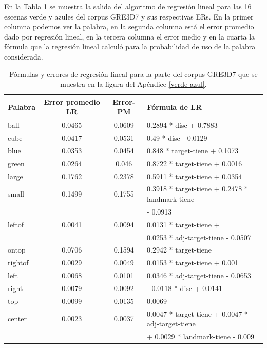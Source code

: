 En la Tabla \ref{tabla-linear-regresion-all} se muestra la salida del algoritmo de regresi\'on lineal para las 16 escenas verde y azules del corpus GRE3D7 y sus respectivas ERs. En la primer columna podemos ver la palabra, 
en la segunda columna est\'a el error promedio dado por regresi\'on lineal, en la tercera columna el error medio 
y en la cuarta la f\'ormula que la regresi\'on lineal calcul\'o para la probabilidad de uso de la palabra considerada.
\medskip
\begin{table}[h]
\begin{center}
\begin{tabular}{|l|c|c|l|}
\hline
Palabra &Error promedio	LR	& Error-PM	& F\'ormula de LR\\
\hline
ball		 &0.0465   &0.0609	  & 0.2894 * disc + 0.7883\\
\hline
cube		 &0.0417	 &0.0531	  &0.49   * disc - 0.0129\\
\hline
\hline
blue		 &0.0353	 &0.0454	  &0.848  * target-tiene + 0.1073\\
\hline
green		 &0.0264	 &0.046	    &0.8722 * target-tiene + 0.0016\\
\hline
\hline
large		 &0.1762	 &0.2378	  &0.5911 * target-tiene + 0.0354\\
\hline
small		 &0.1499	 &0.1755	  &0.3918 * target-tiene + 0.2478 * landmark-tiene\\
				 &				 &					&- 0.0913\\
\hline
\hline
leftof  &0.0041	 &0.0094	  &0.0131 * target-tiene +\\
				 &				 &					&0.0253 * adj-target-tiene - 0.0507\\
\hline
ontop	 &0.0706	 &0.1594	  &0.2942 * target-tiene \\
\hline
rightof &0.0029	 &0.0049	  &0.0153 * target-tiene + 0.001\\
\hline
\hline
left		 &0.0068	 &0.0101	  &0.0346 * adj-target-tiene - 0.0653\\
\hline
right		 &0.0079	 &0.0092	  &- 0.0118 * disc + 0.0141\\
\hline
top    &0.0099 	 &0.0135		& 0.0069\\
\hline
center	 &0.0023	 &0.0037	  &0.0047 * target-tiene + 0.0047 * adj-target-tiene\\
				 &				 &					&+ 0.0029 * landmark-tiene - 0.009\\
\hline
\end{tabular}
\caption{F\'ormulas y errores de regresi\'on lineal para la parte del corpus GRE3D7 que se muestra en la figura del Ap\'endice \ref{verde-azul}.}
\label{tabla-linear-regresion-all}
\end{center}
\end{table}

